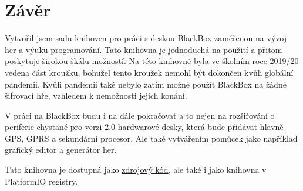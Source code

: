 \chapter{Závěr}

Vytvořil jsem sadu knihoven pro práci s deskou BlackBox zaměřenou na vývoj her a výuku programování.%
Tato knihovna je jednoduchá na použití a přitom poskytuje širokou škálu možností.
Na této knihovně byla ve školním roce 2019/20 vedena část kroužku, bohužel tento kroužek nemohl být dokončen kvůli globální pandemii.
Kvůli pandemii také nebylo zatím možné použít BlackBox na žádné šifrovací hře, vzhledem k nemožnosti jejich konání.

V práci na BlackBox budu i na dále pokračovat a to nejen na rozšiřování o periferie chystané pro verzi 2.0 hardwarové desky, která bude přidávat hlavně GPS, GPRS a sekundární procesor.
Ale také vytvářením pomůcek jako například grafický editor a generátor her.

Tato knihovna je dostupná jako \href{https://github.com/RoboticsBrno/BlackBox_library}{zdrojový kód}, ale také i jako knihovna v PlatformIO registry\cite{pio-registry}.